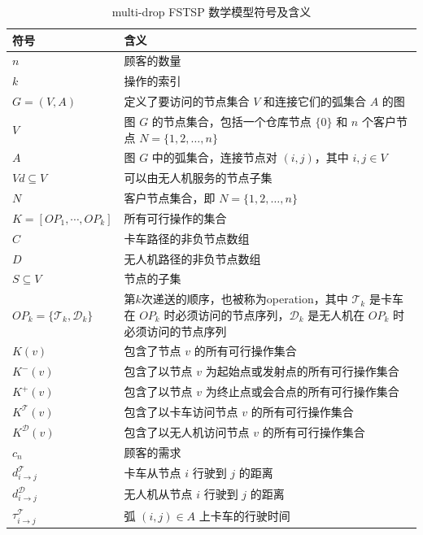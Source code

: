\begin{table}[!htbp]
    \centering
    \caption{multi-drop FSTSP 数学模型符号及含义}
    \label{tab:multi-drop-fstsp-sign-meaning}
    \begin{tabularx}{\textwidth}{lX}
        \toprule[1pt]
        符号 & 含义 \\
        \midrule[0.75pt]
        $n$ & 顾客的数量\\ 
        $k$ &操作的索引\\ 
        $G = (V, A)$ & 定义了要访问的节点集合 $V$ 和连接它们的弧集合 $A$ 的图 \\
        $V$ & 图 $G$ 的节点集合，包括一个仓库节点 $\{0\}$ 和 $n$ 个客户节点 $N = \{1, 2, \dots, n\}$ \\
        $A$ & 图 $G$ 中的弧集合，连接节点对 $(i, j)$，其中 $i, j \in V$ \\
        $Vd \subseteq V$ & 可以由无人机服务的节点子集 \\
        $N$ & 客户节点集合，即 $N = \{1, 2, \dots, n\}$ \\
        $K = [OP_1, \cdots, OP_k]$ & 所有可行操作的集合 \\
        $C$ & 卡车路径的非负节点数组 \\
        $D$ & 无人机路径的非负节点数组 \\
        $S \subseteq V$ & 节点的子集\\ 
        $OP_{k} = \{\mathscr{T}_k,\mathscr{D}_k\}$ & 第$k$次递送的顺序，也被称为operation，其中 $\mathscr{T}_k$ 是卡车在 $OP_k$ 时必须访问的节点序列，$\mathscr{D}_k$ 是无人机在 $OP_k$ 时必须访问的节点序列 \\ 
        $K(v)$ & 包含了节点 $v$ 的所有可行操作集合\\ 
        $K^-(v)$ & 包含了以节点 $v$ 为起始点或发射点的所有可行操作集合\\ 
        $K^+(v)$ & 包含了以节点 $v$ 为终止点或会合点的所有可行操作集合\\ 
        $K^{\mathscr{T}}(v)$ & 包含了以卡车访问节点 $v$ 的所有可行操作集合\\ 
        $K^{\mathscr{D}}(v)$ & 包含了以无人机访问节点 $v$ 的所有可行操作集合\\ 
        $c_n$ & 顾客的需求\\ 
        $d_{i\to j}^\mathscr{T}$ & 卡车从节点 $i$ 行驶到 $j$ 的距离 \\ 
        $d_{i\to j}^\mathscr{D}$ & 无人机从节点 $i$ 行驶到 $j$ 的距离 \\ 
        $\tau_{i\to j}^\mathscr{T}$ & 弧 $(i, j) \in A$ 上卡车的行驶时间 \\

\end{tabularx}
\end{table}
